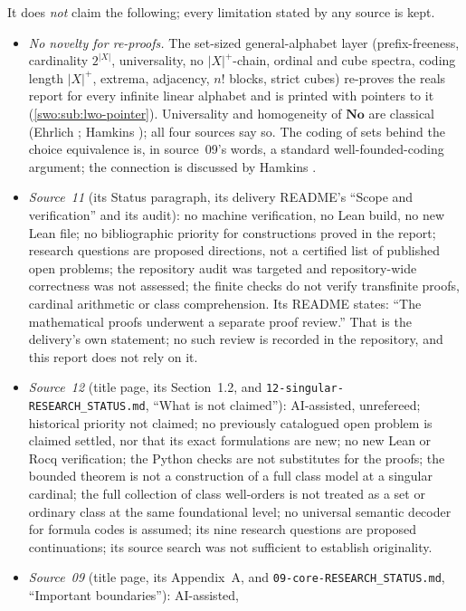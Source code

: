 \documentclass[11pt]{article}
\theoremstyle{definition}
\theoremstyle{remark}
\newcommand{\No}{\mathbf{No}}
\newcommand{\card}[1]{\lvert #1\rvert}
\newcommand{\code}[1]{\texttt{\small #1}}
\begin{document}
It does \emph{not} claim the following; every limitation stated by any
source is kept.
\begin{itemize}
\item \emph{No novelty for re-proofs.} The set-sized general-alphabet layer
(prefix-freeness, cardinality $2^{\card X}$, universality, no
$\card X^+$-chain, ordinal and cube spectra, coding length $\card X^+$,
extrema, adjacency, $n!$ blocks, strict cubes) re-proves the reals report for
every infinite linear alphabet and is printed with pointers to it
(\cref{swo:sub:lwo-pointer}). Universality and homogeneity of $\No$ are
classical (Ehrlich \cite{Ehrlich2012}; Hamkins \cite{HamkinsUniversal}); all
four sources say so. The coding of sets behind the choice equivalence is, in
source~09's words, a standard well-founded-coding argument; the connection is
discussed by Hamkins \cite{HamkinsChoice,HamkinsGC}.
\item \emph{Source~11} (its Status paragraph, its delivery README's ``Scope
and verification'' and its audit): no machine verification, no Lean build, no
new Lean file; no bibliographic priority for constructions proved in the
report; research questions are proposed directions, not a certified list of
published open problems; the repository audit was targeted and
repository-wide correctness was not assessed; the finite checks do not
verify transfinite proofs, cardinal arithmetic or class comprehension. Its
README states: ``The mathematical proofs underwent a separate proof review.''
That is the delivery's own statement; no such review is recorded in the
repository, and this report does not rely on it.
\item \emph{Source~12} (title page, its Section~1.2, and
\code{12-singular-RESEARCH\_STATUS.md}, ``What is not claimed''):
AI-assisted, unrefereed; historical priority not claimed; no previously
catalogued open problem is claimed settled, nor that its exact formulations
are new; no new Lean or Rocq verification; the Python checks are not
substitutes for the proofs; the bounded theorem is not a construction of a
full class model at a singular cardinal; the full collection of class
well-orders is not treated as a set or ordinary class at the same
foundational level; no universal semantic decoder for formula codes is
assumed; its nine research questions are proposed continuations; its source
search was not sufficient to establish originality.
\item \emph{Source~09} (title page, its Appendix~A, and
\code{09-core-RESEARCH\_STATUS.md}, ``Important boundaries''): AI-assisted,

\end{itemize}
\end{document}
